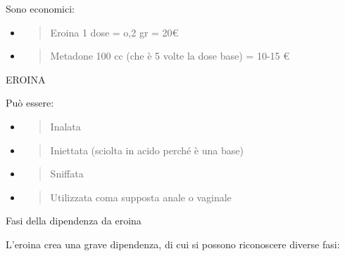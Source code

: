 \documentclass[]{article}
\newcommand{\euro}{€}
\begin{document}
Sono economici:

\begin{itemize}
\item
  \begin{quote}
  Eroina 1 dose = o,2 gr = 20\euro{}
  \end{quote}
\item
  \begin{quote}
  Metadone 100 cc (che è 5 volte la dose base) = 10-15 \euro{}
  \end{quote}
\end{itemize}

EROINA

Può essere:

\begin{itemize}
\item
  \begin{quote}
  Inalata
  \end{quote}
\item
  \begin{quote}
  Iniettata (sciolta in acido perché è una base)
  \end{quote}
\item
  \begin{quote}
  Sniffata
  \end{quote}
\item
  \begin{quote}
  Utilizzata coma supposta anale o vaginale
  \end{quote}
\end{itemize}

Fasi della dipendenza da eroina

L'eroina crea una grave dipendenza, di cui si possono riconoscere
diverse fasi:
\end{document}
